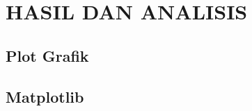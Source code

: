 
\chapter{HASIL DAN ANALISIS}
\label{cha:4-HasilDanAnalisis}

\section{Plot Grafik}
\label{sec:4-PersiapanPengujian}

\section{Matplotlib}
